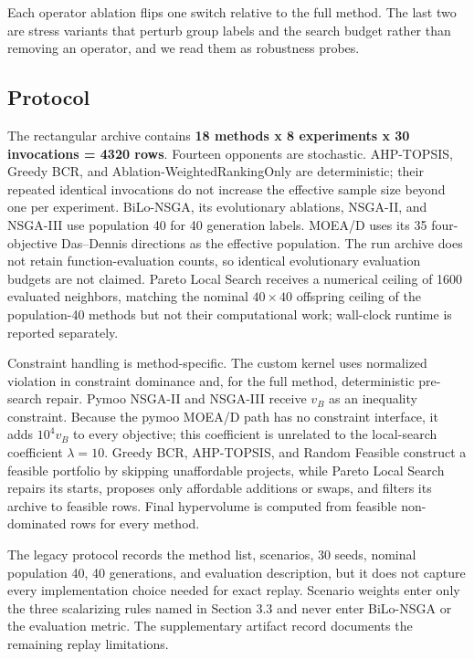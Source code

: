 \documentclass[applsci,article,submit,moreauthors]{Definitions/mdpi}
\begin{document}
Each operator ablation flips one switch relative to the full method. The last two are stress variants that perturb group labels and the search budget rather than removing an operator, and we read them as robustness probes.

\subsection{Protocol}\label{protocol}

The rectangular archive contains \textbf{18 methods x 8 experiments x 30 invocations = 4320 rows}. Fourteen opponents are stochastic. AHP-TOPSIS, Greedy BCR, and Ablation-WeightedRankingOnly are deterministic; their repeated identical invocations do not increase the effective sample size beyond one per experiment. BiLo-NSGA, its evolutionary ablations, NSGA-II, and NSGA-III use population 40 for 40 generation labels. MOEA/D uses its 35 four-objective Das--Dennis directions as the effective population. The run archive does not retain function-evaluation counts, so identical evolutionary evaluation budgets are not claimed. Pareto Local Search receives a numerical ceiling of 1600 evaluated neighbors, matching the nominal \(40\times40\) offspring ceiling of the population-40 methods but not their computational work; wall-clock runtime is reported separately.

Constraint handling is method-specific. The custom kernel uses normalized violation in constraint dominance and, for the full method, deterministic pre-search repair. Pymoo NSGA-II and NSGA-III receive \(v_B\) as an inequality constraint. Because the pymoo MOEA/D path has no constraint interface, it adds \(10^4v_B\) to every objective; this coefficient is unrelated to the local-search coefficient \(\lambda=10\). Greedy BCR, AHP-TOPSIS, and Random Feasible construct a feasible portfolio by skipping unaffordable projects, while Pareto Local Search repairs its starts, proposes only affordable additions or swaps, and filters its archive to feasible rows. Final hypervolume is computed from feasible non-dominated rows for every method.

The legacy protocol records the method list, scenarios, 30 seeds, nominal population 40, 40 generations, and evaluation description, but it does not capture every implementation choice needed for exact replay. Scenario weights enter only the three scalarizing rules named in Section 3.3 and never enter BiLo-NSGA or the evaluation metric. The supplementary artifact record documents the remaining replay limitations.
\end{document}
